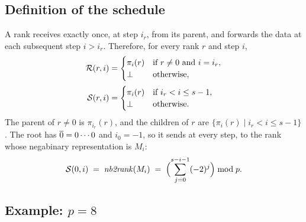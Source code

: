 \subsection{Definition of the schedule}

A rank receives exactly once, at step $i_r$, from its parent, and forwards the data at each subsequent step $i>i_r$.
Therefore, for every rank $r$ and step $i$,
\begin{align}
  \mathcal{R}(r,i) &=
  \begin{cases}
    \pi_i(r) & \text{if } r\neq 0 \text{ and } i=i_r,\\
    \bot & \text{otherwise,}
  \end{cases}
  \label{eq:recv-table}\\[2pt]
  \mathcal{S}(r,i) &=
  \begin{cases}
    \pi_i(r) & \text{if } i_r < i \le s-1,\\
    \bot & \text{otherwise.}
  \end{cases}
  \label{eq:send-table}
\end{align}
The parent of $r\neq0$ is $\pi_{i_r}(r)$, and the children of $r$ are $\{\pi_i(r)\mid i_r<i\le s-1\}$.
The root has $\overline{0}=0\cdots0$ and $i_0=-1$, so it sends at every step, to the rank whose negabinary representation is $M_i$:
\begin{equation}
  \mathcal{S}(0,i) \;=\; \mathit{nb2rank}(M_i)
  \;=\; \Bigl(\sum_{j=0}^{s-i-1}(-2)^j\Bigr)\bmod p .
  \label{eq:root}
\end{equation}

\subsection{Example: \texorpdfstring{$p=8$}{p = 8}}

